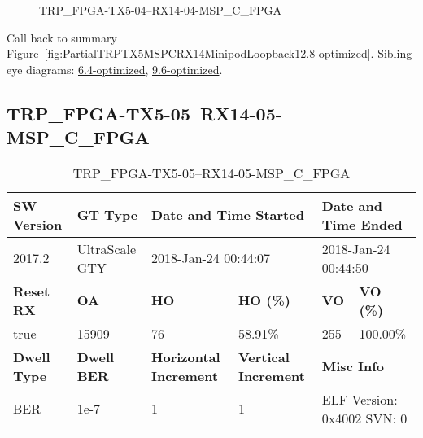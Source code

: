 \begin{figure}[h]
\caption{TRP\_FPGA-TX5-04--RX14-04-MSP\_C\_FPGA} \label{fig:TRPFPGATX504RX1404MSPCFPGA12.8-optimized}
\end{figure}

Call back to summary Figure~\ref{fig:PartialTRPTX5MSPCRX14MinipodLoopback12.8-optimized}.
Sibling eye diagrams: \hyperref[sec:TRPFPGATX504RX1404MSPCFPGA6.4-optimized]{6.4-optimized}, \hyperref[sec:TRPFPGATX504RX1404MSPCFPGA9.6-optimized]{9.6-optimized}.

\clearpage
\newpage


\subsection{TRP\_FPGA-TX5-05--RX14-05-MSP\_C\_FPGA}\label{sec:TRPFPGATX505RX1405MSPCFPGA12.8-optimized}

\begin{table}[h]
\centering
\caption{TRP\_FPGA-TX5-05--RX14-05-MSP\_C\_FPGA}
\label{tab:TRPFPGATX505RX1405MSPCFPGA12.8-optimized}
\begin{tabular}{@{}|l|l|l|l|l|l|@{}}
\toprule
\textbf{SW Version}                & \textbf{GT Type}   & \multicolumn{2}{l|}{\textbf{Date and Time Started}}            & \multicolumn{2}{l|}{\textbf{Date and Time Ended}}        \\ \midrule
2017.2                       & UltraScale GTY          & \multicolumn{2}{l|}{2018-Jan-24 00:44:07}                   & \multicolumn{2}{l|}{2018-Jan-24 00:44:50}               \\ \midrule
\textbf{Reset RX}                  & \textbf{OA} & \textbf{HO}   & \textbf{HO (\%)} & \textbf{VO} & \textbf{VO (\%)} \\ \midrule
true & 15909        & 76          & 58.91\%        & 255        & 100.00\%       \\ \midrule
\textbf{Dwell Type}                & \textbf{Dwell BER} & \textbf{Horizontal Increment} & \textbf{Vertical Increment}    & \multicolumn{2}{l|}{\textbf{Misc Info}}                  \\ \midrule
BER                            & 1e-7        & 1        & 1           & \multicolumn{2}{l|}{ELF Version: 0x4002 SVN: 0}                         \\ \bottomrule
\end{tabular}
\end{table}

